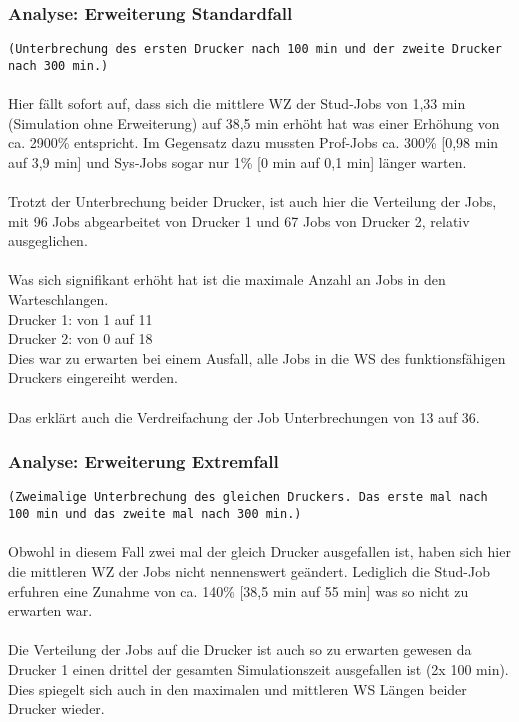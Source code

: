 \documentclass[12pt,a4paper]{article}
\begin{document}
		
		\subsubsection{Analyse: Erweiterung Standardfall}
		\texttt{(Unterbrechung des ersten Drucker nach 100 min und der zweite Drucker nach 300 min.)}
	    \\ \\
		Hier fällt sofort auf, dass sich die mittlere WZ der Stud-Jobs von 1,33 min (Simulation ohne Erweiterung)  auf 38,5 min erhöht hat was einer Erhöhung von ca. 2900\% entspricht. Im Gegensatz dazu
		 mussten Prof-Jobs ca. 300\% 
		[0,98 min auf 3,9 min] und Sys-Jobs sogar nur 1\% [0 min auf 0,1 min] länger warten.\\
		\\
		Trotzt der Unterbrechung beider Drucker, ist auch hier die Verteilung der Jobs, mit 96 Jobs abgearbeitet von Drucker 1 und 67 Jobs von Drucker 2, relativ ausgeglichen.\\
		\\
		Was sich signifikant erhöht hat ist die maximale Anzahl an Jobs in den Warteschlangen. \\
		Drucker 1: von 1 auf 11\\
		Drucker 2: von 0 auf 18\\
		Dies war zu erwarten bei einem Ausfall, alle Jobs in die WS des funktionsfähigen Druckers eingereiht werden.\\
		\\
		Das erklärt auch die Verdreifachung der Job Unterbrechungen von 13 auf 36.
		
		\subsubsection{Analyse: Erweiterung Extremfall}
		\texttt{(Zweimalige Unterbrechung des gleichen Druckers. Das erste mal nach 100 min und das zweite mal nach 300 min.)}
		\\ \\
		Obwohl in diesem Fall zwei mal der gleich Drucker ausgefallen ist, haben sich hier die mittleren WZ der Jobs nicht nennenswert geändert. Lediglich die Stud-Job erfuhren eine Zunahme von ca. 140\%
		 [38,5 min auf 55 min] was so nicht zu erwarten war.\\
		\\
		Die Verteilung der Jobs auf die Drucker ist auch so zu erwarten gewesen da Drucker 1 einen drittel der gesamten Simulationszeit ausgefallen ist (2x 100 min). Dies spiegelt sich auch in den maximalen und
		 mittleren WS Längen beider Drucker wieder.
\end{document}

